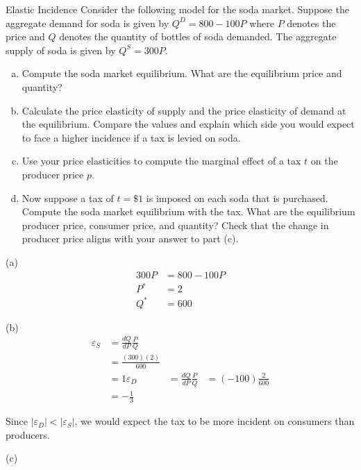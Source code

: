 \documentclass[8pt]{extarticle}
\title{}
\author{}
\date{}
\begin{document}
  \begin{problem}{Elastic Incidence}
    Consider the following model for the soda market. Suppose the aggregate demand for soda is given by $Q^D = 800 - 100P$ where $P$ denotes the price and $Q$ denotes the quantity of bottles of soda demanded. The aggregate supply of soda is given by $Q^S = 300P$.
    \begin{enumerate}[(a)]
      \item Compute the soda market equilibrium. What are the equilibrium price and quantity?
      \item Calculate the price elasticity of supply and the price elasticity of demand at the equilibrium. Compare the values and explain which side you would expect to face a higher incidence if a tax is levied on soda.
      \item Use your price elasticities to compute the marginal effect of a tax $t$ on the producer price $p$.
      \item Now suppose a tax of $t = \$1$ is imposed on each soda that is purchased. Compute the soda market equilibrium with the tax. What are the equilibrium producer price, consumer price, and quantity? Check that the change in producer price aligns with your answer to part (c).
    \end{enumerate}
    \tcblower
    \begin{problem}{(a)}
      \begin{align*}
        300P &= 800 - 100P\\
        P^{\ast} &= 2\\
        Q^{\ast} &= 600
      \end{align*}
    \end{problem}
    \begin{problem}{(b)}
      \begin{align*}
        \varepsilon_S &= \frac{dQ}{dP}\frac{P}{Q}\\
                      &= \frac{(300)(2)}{600}\\
                      &= 1
        \varepsilon_D &= \frac{dQ}{dP}\frac{P}{Q}
                      &= (-100)\frac{2}{600}\\
                      &= -\frac{1}{3}
      \end{align*}
    \end{problem}
    Since $|\varepsilon_D| < |\varepsilon_S|$, we would expect the tax to be more incident on consumers than producers.
    \begin{problem}{(c)}
      \begin{align*}

\end{align*}
\end{problem}
\end{problem}
\end{document}
